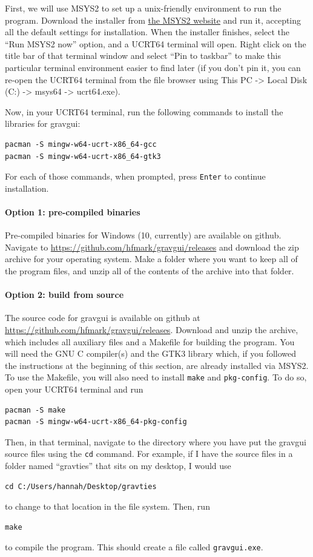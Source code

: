 \documentclass{pfpe-manual}
\begin{document}
First, we will use MSYS2 to set up a unix-friendly environment to run the program. Download the installer from \href{https://www.msys2.org/}{the MSYS2 website} and run it, accepting all the default settings for installation. When the installer finishes, select the ``Run MSYS2 now'' option, and a UCRT64 terminal will open. Right click on the title bar of that terminal window and select ``Pin to taskbar'' to make this particular terminal environment easier to find later (if you don't pin it, you can re-open the UCRT64 terminal from the file browser using This PC -> Local Disk (C:) -> msys64 -> ucrt64.exe).

Now, in your UCRT64 terminal, run the following commands to install the libraries for gravgui:
\begin{verbatim}
pacman -S mingw-w64-ucrt-x86_64-gcc
pacman -S mingw-w64-ucrt-x86_64-gtk3
\end{verbatim}
For each of those commands, when prompted, press \texttt{Enter} to continue installation.

\paragraph{Option 1: pre-compiled binaries}
Pre-compiled binaries for Windows (10, currently) are available on github. Navigate to \url{https://github.com/hfmark/gravgui/releases} and download the zip archive for your operating system. Make a folder where you want to keep all of the program files, and unzip all of the contents of the archive into that folder.

\paragraph{Option 2: build from source}
The source code for gravgui is available on github at \url{https://github.com/hfmark/gravgui/releases}. Download and unzip the archive, which includes all auxiliary files and a Makefile for building the program. You will need the GNU C compiler(s) and the GTK3 library which, if you followed the instructions at the beginning of this section, are already installed via MSYS2. To use the Makefile, you will also need to install \texttt{make} and \texttt{pkg-config}. To do so, open your UCRT64 terminal and run
\begin{verbatim}
pacman -S make
pacman -S mingw-w64-ucrt-x86_64-pkg-config
\end{verbatim}
Then, in that terminal, navigate to the directory where you have put the gravgui source files using the \texttt{cd} command. For example, if I have the source files in a folder named ``gravties'' that sits on my desktop, I would use
\begin{verbatim}
cd C:/Users/hannah/Desktop/gravties
\end{verbatim}
to change to that location in the file system. Then, run 
\begin{verbatim}
make
\end{verbatim}
to compile the program. This should create a file called \texttt{gravgui.exe}.
\end{document}
